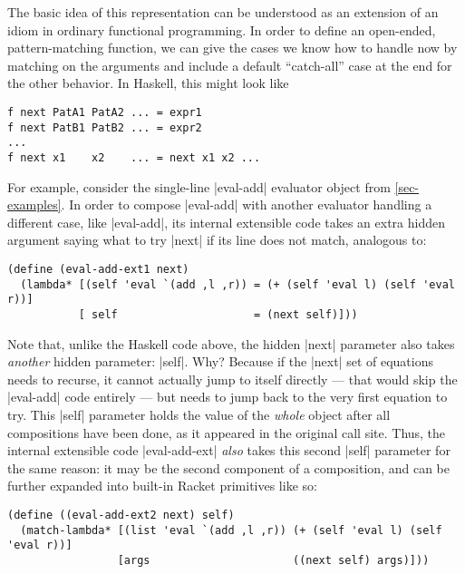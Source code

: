 The basic idea of this representation can be understood as an extension of an idiom in ordinary functional programming.
In order to define an open-ended, pattern-matching function, we can give the cases we know how to handle now by matching on the arguments and include a default ``catch-all'' case at the end for the other behavior.
In Haskell, this might look like
\begin{verbatim}
f next PatA1 PatA2 ... = expr1
f next PatB1 PatB2 ... = expr2
...
f next x1    x2    ... = next x1 x2 ...
\end{verbatim}

For example, consider the single-line \scm|eval-add| evaluator object from \cref{sec-examples}.
In order to compose \scm|eval-add| with another evaluator handling a different case, like \scm|eval-add|, its internal extensible code takes an extra hidden argument saying what to try \scm|next| if its line does not match, analogous to:
\begin{verbatim}
(define (eval-add-ext1 next)
  (lambda* [(self 'eval `(add ,l ,r)) = (+ (self 'eval l) (self 'eval r))]
           [ self                     = (next self)]))
\end{verbatim}
Note that, unlike the Haskell code above, the hidden \scm|next| parameter also takes \emph{another} hidden parameter: \scm|self|.
Why?
Because if the \scm|next| set of equations needs to recurse, it cannot actually jump to itself directly --- that would skip the \scm|eval-add| code entirely --- but needs to jump back to the very first equation to try.
This \scm|self| parameter holds the value of the \emph{whole} object after all compositions have been done, as it appeared in the original call site.
Thus, the internal extensible code \scm|eval-add-ext| \emph{also} takes this second \scm|self| parameter for the same reason: it may be the second component of a composition, and can be further expanded into built-in Racket primitives like so:
\begin{verbatim}
(define ((eval-add-ext2 next) self)
  (match-lambda* [(list 'eval `(add ,l ,r)) (+ (self 'eval l) (self 'eval r))]
                 [args                      ((next self) args)]))
\end{verbatim}


